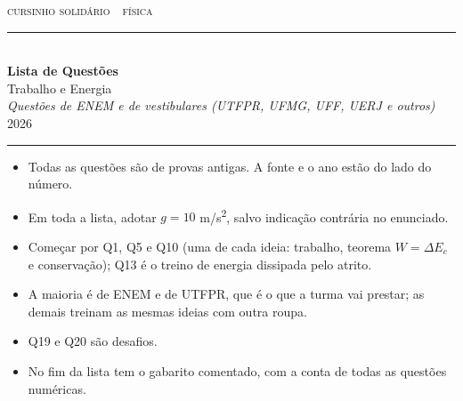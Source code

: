 \documentclass[11pt,a4paper]{article}
\begin{document}

\thispagestyle{empty}

{\scshape\color{vinho}cursinho solid\'ario \,\textperiodcentered\, f\'isica}\\[-0.5em]
{\color{vinho}\rule{\linewidth}{1.6pt}}\\[0.9em]
{\huge\bfseries Lista de Quest\~oes}\\[0.35em]
{\LARGE Trabalho e Energia}\\[0.7em]
{\itshape\color{grafite}Quest\~oes de ENEM e de vestibulares
(UTFPR, UFMG, UFF, UERJ e outros)}
\hfill {\color{grafite}2026}\\[-0.3em]
{\color{black!30}\rule{\linewidth}{0.5pt}}

\vspace{1.0em}

\begin{painel}

\begin{itemize}[nosep, leftmargin=1.5em]
  \item Todas as quest\~oes s\~ao de provas antigas. A fonte e o ano
        est\~ao do lado do n\'umero.
  \item Em toda a lista, adotar $g = 10$ m/s\textsuperscript{2},
        salvo indica\c{c}\~ao contr\'aria no enunciado.
  \item Come\c{c}ar por Q1, Q5 e Q10 (uma de cada ideia: trabalho,
        teorema $W = \Delta E_c$ e conserva\c{c}\~ao); Q13 \'e o
        treino de energia dissipada pelo atrito.
  \item A maioria \'e de ENEM e de UTFPR, que \'e o que a turma vai
        prestar; as demais treinam as mesmas ideias com outra roupa.
  \item Q19 e Q20 s\~ao desafios.
  \item No fim da lista tem o gabarito comentado, com a conta de
        todas as quest\~oes num\'ericas.
\end{itemize}
\end{painel}

\newpage
\end{document}
